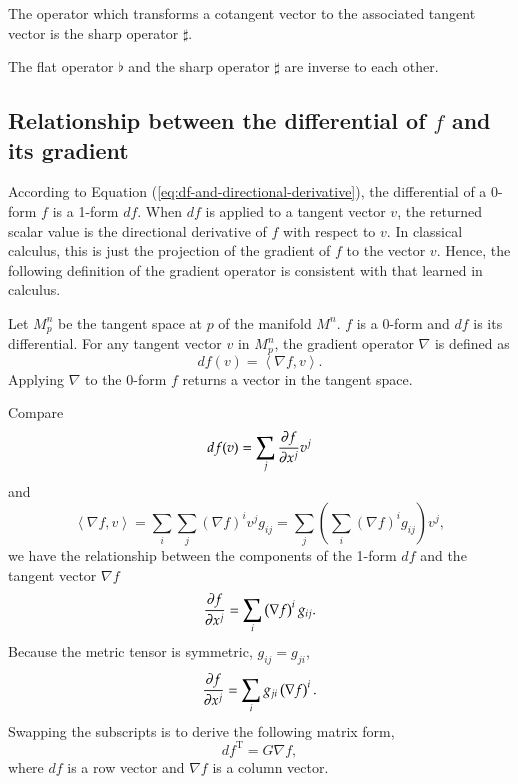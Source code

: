 \documentclass[11pt, a4paper]{book}
\begin{document}
\begin{Definition}
  \label{def:sharp-operator}
  The operator which transforms a cotangent vector to the associated tangent vector is the
  sharp operator $\sharp$.
\end{Definition}

The flat operator $\flat$ and the sharp operator $\sharp$ are inverse to each other.

\subsection{Relationship between the differential of $f$ and its gradient}

According to Equation (\ref{eq:df-and-directional-derivative}), the differential of a
0-form $f$ is a 1-form $df$. When $df$ is applied to a tangent vector $v$, the returned
scalar value is the directional derivative of $f$ with respect to $v$. In classical
calculus, this is just the projection of the gradient of $f$ to the vector $v$. Hence, the
following definition of the gradient operator is consistent with that learned in calculus.

\begin{Definition}
  \label{def:gradient-operator}
  Let $M_p^n$ be the tangent space at $p$ of the manifold $M^n$. $f$ is a 0-form and $df$
  is its differential. For any tangent vector $v$ in $M_p^n$, the gradient operator
  $\nabla$ is defined as
  \begin{equation}
    \label{eq:gradient-operator}
    df(v) = \left\langle \nabla f, v \right\rangle.
  \end{equation}
  Applying $\nabla$ to the 0-form $f$ returns a vector in the tangent space.
\end{Definition}
Compare
\begin{equation*}
  df(v) = \sum_j \frac{\partial f}{\partial x^j} v^j
\end{equation*}
and
\begin{equation*}
  \left\langle \nabla f, v \right\rangle = \sum_i\sum_j \left( \nabla f \right)^i v^j
  g_{ij} = \sum_j \left( \sum_i \left( \nabla f \right)^i g_{ij} \right) v^j,
\end{equation*}
we have the relationship between the components of the 1-form $df$ and the tangent vector
$\nabla f$
\begin{equation*}
  \frac{\partial f}{\partial x^j} = \sum_i \left( \nabla f \right)^i g_{ij}.
\end{equation*}
Because the metric tensor is symmetric, $g_{ij} = g_{ji}$,
\begin{equation}
  \label{eq:gradient-to-df}
  \frac{\partial f}{\partial x^j} = \sum_i g_{ji} \left( \nabla f \right)^i.
\end{equation}
Swapping the subscripts is to derive the following matrix form,
\begin{equation}
  df^{\mathrm{T}} = G \nabla f,
\end{equation}
where $df$ is a row vector and $\nabla f$ is a column vector.
\end{document}
